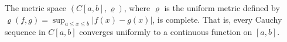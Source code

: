The metric space $(C[a,b], \varrho)$, where $\varrho$ is the uniform metric defined by $\varrho(f, g) = \sup_{a \leq x \leq b} |f(x) - g(x)|$, is complete. That is, every Cauchy sequence in $C[a,b]$ converges uniformly to a continuous function on $[a,b]$.
